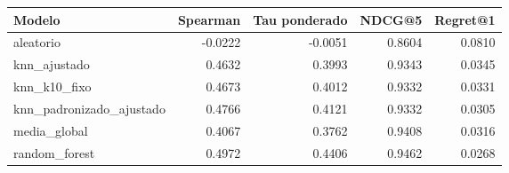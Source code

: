 \begin{tabular}{lrrrr}
\toprule
Modelo & Spearman & Tau ponderado & NDCG@5 & Regret@1 \\
\midrule
aleatorio & -0.0222 & -0.0051 & 0.8604 & 0.0810 \\
knn\_ajustado & 0.4632 & 0.3993 & 0.9343 & 0.0345 \\
knn\_k10\_fixo & 0.4673 & 0.4012 & 0.9332 & 0.0331 \\
knn\_padronizado\_ajustado & 0.4766 & 0.4121 & 0.9332 & 0.0305 \\
media\_global & 0.4067 & 0.3762 & 0.9408 & 0.0316 \\
random\_forest & 0.4972 & 0.4406 & 0.9462 & 0.0268 \\
\bottomrule
\end{tabular}